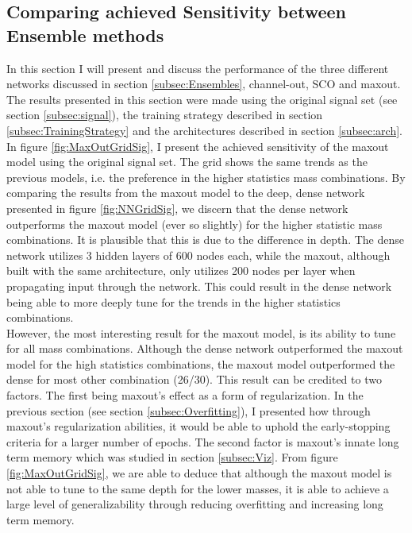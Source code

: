 \subsection{Comparing achieved Sensitivity between Ensemble methods}
In this section I will present and discuss the performance of the three different networks discussed in section 
\ref{subsec:Ensembles}, channel-out, \ac{SCO} and maxout. The results presented in this section were made using the
original signal set (see section \ref{subsec:signal}), the training strategy described in section \ref{subsec:TrainingStrategy}
and the architectures described in section \ref{subsec:arch}.
\\
In figure \ref{fig:MaxOutGridSig}, I present the achieved sensitivity of the maxout model using the original signal set. 
The grid shows the same trends as the previous models, i.e. the preference in the higher statistics mass combinations. By comparing 
the results from the maxout model to the deep, dense network presented in figure \ref{fig:NNGridSig}, we discern that the dense 
network outperforms the maxout model (ever so slightly) for the higher statistic mass combinations. It is plausible that this is due 
to the difference in depth. The dense network utilizes 3 hidden layers of 600 nodes each, while the maxout, although built with the 
same architecture, only utilizes 200 nodes per layer when propagating input through the network. This could result in the dense network 
being able to more deeply tune for the trends in the higher statistics combinations.
\\
However, the most interesting result for the maxout model, is its ability to tune for all mass combinations. Although the dense network
outperformed the maxout model for the high statistics combinations, the maxout model outperformed the dense for most other combination (26/30).
This result can be credited to two factors. The first being maxout's effect as a form of regularization. In the previous 
section (see section \ref{subsec:Overfitting}), I presented how through maxout's regularization abilities, it would be able to 
uphold the early-stopping criteria for a larger number of epochs. The second factor is maxout's innate long term memory which was studied
in section \ref{subsec:Viz}. From figure \ref{fig:MaxOutGridSig}, we are able to deduce that although the maxout model is not able to tune 
to the same depth for the lower masses, it is able to achieve a large level of generalizability through reducing overfitting and increasing long term memory.\\

